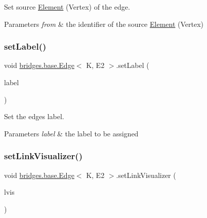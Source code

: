 Set source \hyperlink{classbridges_1_1base_1_1_element}{Element} (Vertex) of the edge. 


\begin{DoxyParams}{Parameters}
{\em from} & the identifier of the source \hyperlink{classbridges_1_1base_1_1_element}{Element} (Vertex) \\
\hline
\end{DoxyParams}
\mbox{\label{classbridges_1_1base_1_1_edge_ad5f1d55a3c8caeb975f497dfe4f29242}} 
\subsubsection{\texorpdfstring{set\+Label()}{setLabel()}}
{\footnotesize\ttfamily void \hyperlink{classbridges_1_1base_1_1_edge}{bridges.\+base.\+Edge}$<$ K, E2 $>$.set\+Label (\begin{DoxyParamCaption}\item[{String}]{label }\end{DoxyParamCaption})}



Set the edge\textquotesingle{}s label. 


\begin{DoxyParams}{Parameters}
{\em label} & the label to be assigned \\
\hline
\end{DoxyParams}
\mbox{\label{classbridges_1_1base_1_1_edge_a1bb8008507d26245468bf9d0f1452072}} 
\subsubsection{\texorpdfstring{set\+Link\+Visualizer()}{setLinkVisualizer()}}
{\footnotesize\ttfamily void \hyperlink{classbridges_1_1base_1_1_edge}{bridges.\+base.\+Edge}$<$ K, E2 $>$.set\+Link\+Visualizer (\begin{DoxyParamCaption}\item[{\hyperlink{classbridges_1_1base_1_1_link_visualizer}{Link\+Visualizer}}]{lvis }\end{DoxyParamCaption})}



